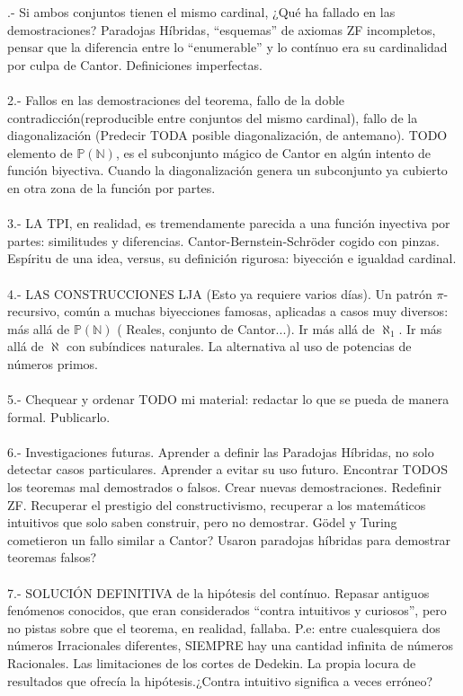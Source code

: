 .- Si ambos conjuntos tienen el mismo cardinal, ¿Qué ha fallado en las demostraciones? Paradojas Híbridas, ``esquemas'' de axiomas ZF incompletos, pensar que la diferencia entre lo ``enumerable'' y lo contínuo era su cardinalidad por culpa de Cantor. Definiciones imperfectas.\\\\
2.- Fallos en las demostraciones del teorema, fallo de la doble contradicción(reproducible entre conjuntos del mismo cardinal), fallo de la diagonalización (Predecir TODA posible diagonalización, de antemano). TODO elemento de $\mathbb{P(N)}$, es el subconjunto mágico de Cantor en algún intento de función biyectiva. Cuando la diagonalización genera un subconjunto ya cubierto en otra zona de la función por partes.\\\\
3.- LA TPI, en realidad, es tremendamente parecida a una función inyectiva por partes: similitudes y diferencias. Cantor-Bernstein-Schröder cogido con pinzas. Espíritu de una idea, versus, su definición rigurosa: biyección e igualdad cardinal.\\\\
4.- LAS CONSTRUCCIONES LJA (Esto ya requiere varios días). Un patrón $\pi$-recursivo, común a muchas biyecciones famosas, aplicadas a casos muy diversos: más allá de $\mathbb{P(N)}$ ( Reales, conjunto de Cantor...). Ir más allá de $\aleph_{1}$. Ir más allá de $\aleph$ con subíndices naturales. La alternativa al uso de potencias de números primos.\\\\
5.- Chequear y ordenar TODO mi material: redactar lo que se pueda de manera formal. Publicarlo.\\\\
6.- Investigaciones futuras. Aprender a definir las Paradojas Híbridas, no solo detectar casos particulares. Aprender a evitar su uso futuro. Encontrar TODOS los teoremas mal demostrados o falsos. Crear nuevas demostraciones. Redefinir ZF. Recuperar el prestigio del constructivismo, recuperar a los matemáticos intuitivos que solo saben construir, pero no demostrar. Gödel y Turing cometieron un fallo similar a Cantor? Usaron paradojas híbridas para demostrar teoremas falsos?\\\\
7.- SOLUCIÓN DEFINITIVA de la hipótesis del contínuo. Repasar antiguos fenómenos conocidos, que eran considerados ``contra intuitivos y curiosos'', pero no pistas sobre que el teorema, en realidad, fallaba. P.e: entre cualesquiera dos números Irracionales diferentes, SIEMPRE hay una cantidad infinita de números Racionales. Las limitaciones de los cortes de Dedekin. La propia locura de resultados que ofrecía la hipótesis.¿Contra intuitivo significa a veces erróneo?\\\\
